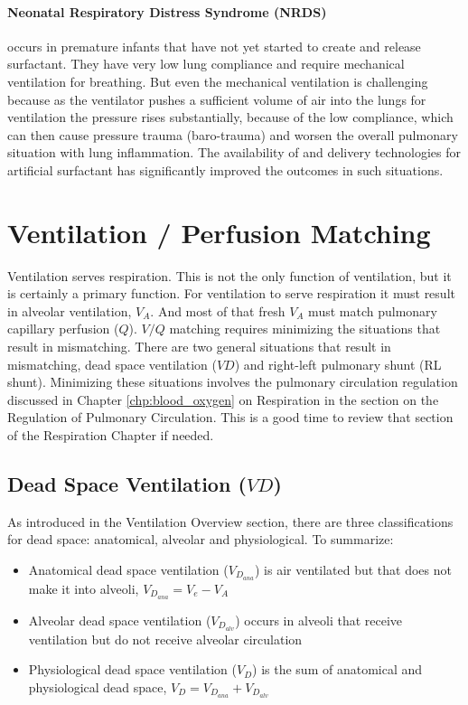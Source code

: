 \paragraph{Neonatal Respiratory Distress Syndrome (NRDS)} occurs in premature infants that have not yet started to create and release surfactant. They have very low lung compliance and require mechanical ventilation for breathing. But even the mechanical ventilation is challenging because as the ventilator pushes a sufficient volume of air into the lungs for ventilation the pressure rises substantially, because of the low compliance, which can then cause pressure trauma (baro-trauma) and worsen the overall pulmonary situation with lung inflammation. The availability of and delivery technologies for artificial surfactant has significantly improved the outcomes in such situations.

\section{Ventilation / Perfusion Matching}

Ventilation serves respiration. This is not the only function of ventilation, but it is certainly a primary function. For ventilation to serve respiration it must result in alveolar ventilation, $V_A$. And most of that fresh $V_A$ must match pulmonary capillary perfusion ($Q$). $V/Q$ matching requires minimizing the situations that result in mismatching. There are two general situations that result in mismatching, dead space ventilation ($VD$) and right-left pulmonary shunt (RL shunt). Minimizing these situations involves the pulmonary circulation regulation discussed in Chapter \ref{chp:blood_oxygen} on Respiration in the section on the Regulation of Pulmonary Circulation. This is a good time to review that section of the Respiration Chapter if needed.

\subsection{Dead Space Ventilation ($VD$)}

As introduced in the Ventilation Overview section, there are three classifications for dead space: anatomical, alveolar and physiological.  
\vspace{3mm}
To summarize:
\begin{itemize}
       \item Anatomical dead space ventilation ($V_D_{ana}$) is air ventilated but that does not make it into alveoli, $V_D_{ana} = V_e - V_A$
    \item Alveolar dead space ventilation ($V_D_{alv}$) occurs in alveoli that receive ventilation but do not receive alveolar circulation
    \item Physiological dead space ventilation ($V_D$) is the sum of anatomical and physiological dead space, $V_D = V_D_{ana} + V_D_{alv}$
\end{itemize}

